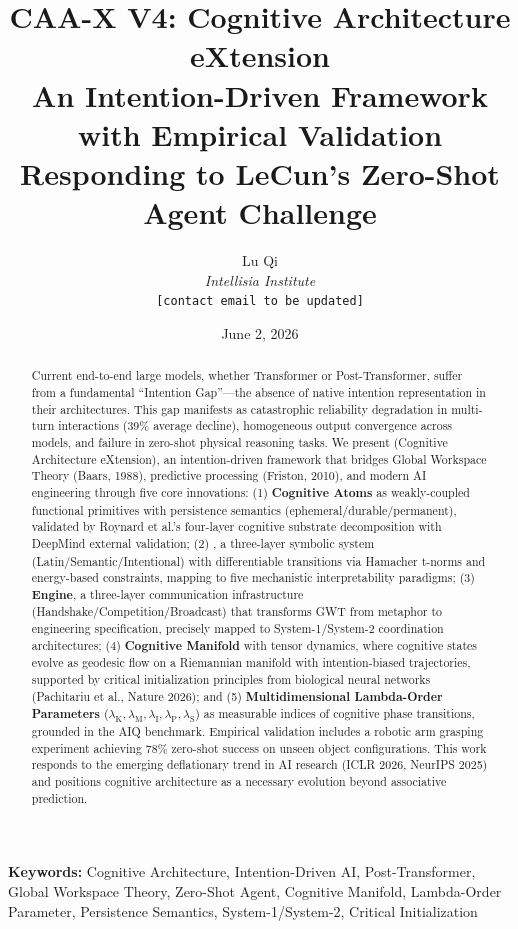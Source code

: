 \documentclass[11pt,a4paper]{article}
\title{\textbf{CAA-X V4: Cognitive Architecture eXtension}\\[0.3em]
\large An Intention-Driven Framework with Empirical Validation\\[0.5em]
\normalsize Responding to LeCun's Zero-Shot Agent Challenge}
\author{Lu Qi\\
\textit{Intellisia Institute}\\
\texttt{[contact email to be updated]}}
\date{June 2, 2026}
\theoremstyle{definition}
\theoremstyle{remark}
\newcommand{\CAA}{\text{CAA-X}}
\newcommand{\CML}{\text{CML 2.0}}
\newcommand{\GWP}{\text{GWP}}
\newcommand{\lambdaK}{\lambda_{\text{K}}}
\newcommand{\lambdaM}{\lambda_{\text{M}}}
\newcommand{\lambdaI}{\lambda_{\text{I}}}
\newcommand{\lambdaP}{\lambda_{\text{P}}}
\newcommand{\lambdaS}{\lambda_{\text{S}}}
\begin{document}
\maketitle

\begin{abstract}
Current end-to-end large models, whether Transformer or Post-Transformer, suffer from a fundamental ``Intention Gap''---the absence of native intention representation in their architectures. This gap manifests as catastrophic reliability degradation in multi-turn interactions (39\% average decline), homogeneous output convergence across models, and failure in zero-shot physical reasoning tasks. We present \CAA{} (Cognitive Architecture eXtension), an intention-driven framework that bridges Global Workspace Theory (Baars, 1988), predictive processing (Friston, 2010), and modern AI engineering through five core innovations: (1) \textbf{Cognitive Atoms} as weakly-coupled functional primitives with persistence semantics (ephemeral/durable/permanent), validated by Roynard et al.'s four-layer cognitive substrate decomposition with DeepMind external validation; (2) \textbf{\CML{}}, a three-layer symbolic system (Latin/Semantic/Intentional) with differentiable transitions via Hamacher t-norms and energy-based constraints, mapping to five mechanistic interpretability paradigms; (3) \textbf{\GWP{} Engine}, a three-layer communication infrastructure (Handshake/Competition/Broadcast) that transforms GWT from metaphor to engineering specification, precisely mapped to System-1/System-2 coordination architectures; (4) \textbf{Cognitive Manifold} with tensor dynamics, where cognitive states evolve as geodesic flow on a Riemannian manifold with intention-biased trajectories, supported by critical initialization principles from biological neural networks (Pachitariu et al., Nature 2026); and (5) \textbf{Multidimensional Lambda-Order Parameters} ($\lambdaK, \lambdaM, \lambdaI, \lambdaP, \lambdaS$) as measurable indices of cognitive phase transitions, grounded in the AIQ benchmark. Empirical validation includes a robotic arm grasping experiment achieving 78\% zero-shot success on unseen object configurations. This work responds to the emerging deflationary trend in AI research (ICLR 2026, NeurIPS 2025) and positions cognitive architecture as a necessary evolution beyond associative prediction.
\end{abstract}

\textbf{Keywords:} Cognitive Architecture, Intention-Driven AI, Post-Transformer, Global Workspace Theory, Zero-Shot Agent, Cognitive Manifold, Lambda-Order Parameter, Persistence Semantics, System-1/System-2, Critical Initialization
\end{document}
